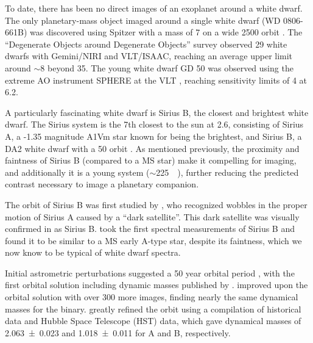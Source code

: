 \documentclass[twocolumn]{aastex631}
\begin{document}
To date, there has been no direct images of an exoplanet around a white dwarf. The only planetary-mass object imaged around a single white dwarf (WD 0806-661B) was discovered using Spitzer with a mass of \qty{7}{\jupitermass} on a wide \qty{2500}{\au} orbit \citep{luhman_discovery_2011}. The ``Degenerate Objects around Degenerate Objects'' survey \citep[DODO;][]{hogan_dodo_2009} observed 29 white dwarfs with Gemini/NIRI and VLT/ISAAC, reaching an average upper limit around $\sim$\qty{8}{\jupitermass} beyond \qty{35}{\au}. The young white dwarf GD 50 was observed using the extreme AO instrument SPHERE at the VLT \citep{xu_extreme-ao_2015}, reaching sensitivity limits of \qty{4}{\jupitermass} at \qty{6.2}{\au}.

A particularly fascinating white dwarf is Sirius B, the closest and brightest white dwarf. The Sirius system is the 7th closest to the sun at \qty{2.6}{\parsec}, consisting of Sirius A, a -1.35 magnitude A1Vm star known for being the brightest, and Sirius B, a DA2 white dwarf with a \qty{50}{\year} orbit \citep{bond_sirius_2017,gaia_collaboration_gaia_2018}. As mentioned previously, the proximity and faintness of Sirius B (compared to a MS star) make it compelling for imaging, and additionally it is a young system ($\sim$\qty{225}{\mega\year}), further reducing the predicted contrast necessary to image a planetary companion.

The orbit of Sirius B was first studied by \citet{bessel_variations_1844}, who recognized wobbles in the proper motion of Sirius A caused by a ``dark satellite''. This dark satellite was visually confirmed in \citet{bond_companion_1862} as Sirius B. \citet{adams_spectrum_1915} took the first spectral measurements of Sirius B and found it to be similar to a MS early A-type star, despite its faintness, which we now know to be typical of white dwarf spectra. 

Initial astrometric perturbations suggested a 50 year orbital period \citep{auwers_orbit_1864}, with the first orbital solution including dynamic masses published by \citet{van_den_bos_orbit_1960}. \citet{gatewood_study_1978} improved upon the \citeauthor{van_den_bos_orbit_1960} orbital solution with over 300 more images, finding nearly the same dynamical masses for the binary. \citet{bond_sirius_2017} greatly refined the orbit using a compilation of historical data and Hubble Space Telescope (HST) data, which gave dynamical masses of \qty{2.063+-0.023}{\solarmass} and \qty{1.018+-0.011}{\solarmass} for A and B, respectively.
\end{document}
